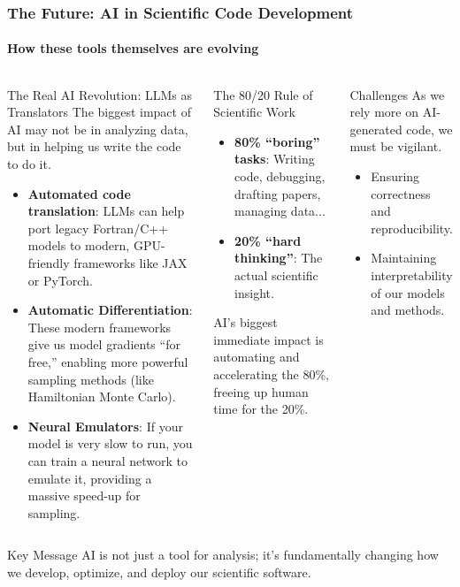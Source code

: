 \documentclass[aspectratio=169]{beamer}
\newcommand{\keyterm}[1]{\textbf{\textcolor{C0}{#1}}}
\begin{document}
\begin{frame}
    \frametitle{The Future: AI in Scientific Code Development}
    \framesubtitle{How these tools themselves are evolving}
    \begin{columns}[T]
        \begin{block}{The Real AI Revolution: LLMs as Translators}
            The biggest impact of AI may not be in analyzing data, but in helping us write the code to do it.
            \begin{itemize}
                \item \keyterm{Automated code translation}: LLMs can help port legacy Fortran/C++ models to modern, GPU-friendly frameworks like JAX or PyTorch.
                \item \keyterm{Automatic Differentiation}: These modern frameworks give us model gradients ``for free,'' enabling more powerful sampling methods (like Hamiltonian Monte Carlo).
                \item \keyterm{Neural Emulators}: If your model is very slow to run, you can train a neural network to emulate it, providing a massive speed-up for sampling.
            \end{itemize}
        \end{block}
        
        \begin{block}{The 80/20 Rule of Scientific Work}
            \begin{itemize}
                \item \textbf{80\% ``boring'' tasks}: Writing code, debugging, drafting papers, managing data...
                \item \textbf{20\% ``hard thinking''}: The actual scientific insight.
            \end{itemize}
            AI's biggest immediate impact is automating and accelerating the 80\%, freeing up human time for the 20\%.
        \end{block}
        
        \begin{block}{Challenges}
            As we rely more on AI-generated code, we must be vigilant.
            \begin{itemize}
                \item Ensuring correctness and reproducibility.
                \item Maintaining interpretability of our models and methods.
            \end{itemize}
        \end{block}
    \end{columns}
    
    \begin{alertblock}{Key Message}
        AI is not just a tool for analysis; it's fundamentally changing how we develop, optimize, and deploy our scientific software.
    \end{alertblock}
\end{frame}
\end{document}
